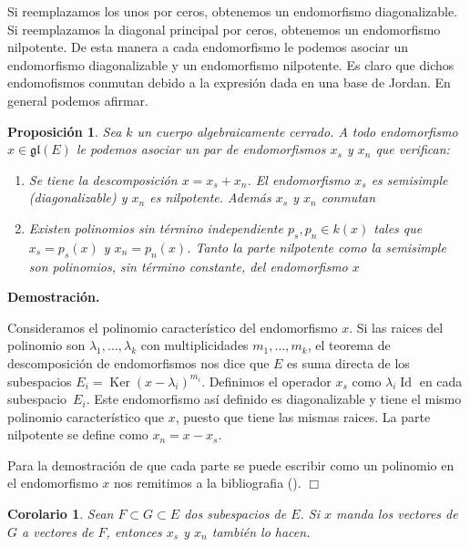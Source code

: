 \documentclass[a4paper,draft,12pt]{article}
\newtheorem{propo}[teo]{Proposición}%
\newtheorem{cor}[teo]{Corolario}%
\newcommand{\dem}{\noindent \textbf{Demostración. }\vspace{0.3 cm}}%
\newcommand{\fin}{ $\Box $ \vspace{0.4 cm}}
\DeclareMathOperator{\Ker}{Ker}%
\DeclareMathOperator{\Id}{Id}%
\begin{document}
Si reemplazamos los  unos por ceros, obtenemos un endomorfismo diagonalizable.  Si reemplazamos la diagonal principal por ceros, obtenemos un endomorfismo nilpotente. De esta manera a cada endomorfismo le podemos asociar un endomorfismo diagonalizable y un endomorfismo nilpotente.  Es claro que dichos endomofismos conmutan debido a la expresión dada en una base de Jordan. En general podemos afirmar.

\begin{propo}
Sea $k$ un cuerpo algebraicamente cerrado.
 A todo endomorfismo $x \in \mathfrak{gl}(E)$ le podemos asociar un par de endomorfismos $x_s$ y $x_n$ que verifican:
 
 \begin{enumerate}[\indent 1.- ]
 
 \item Se tiene la descomposición $x= x_s+x_n$. El endomorfismo $x_s$ es semisimple (diagonalizable) y $x_n$ es nilpotente. Además $x_s$ y $x_n$ conmutan
 
 \item Existen polinomios  sin término independiente $p_s, p_n \in k(x)$ tales que $x_s = p_s(x)$ y $x_n= p_n(x)$.  Tanto la parte nilpotente como la semisimple son polinomios, sin término constante, del endomorfismo $x$
 
 \end{enumerate}
 
 \end{propo}


\dem

Consideramos el polinomio característico del endomorfismo $x$.  Si las raices del polinomio son $\lambda_1, \dots, \lambda_k$ con multiplicidades $m_1,\dots,m_k$, el teorema de descomposición de endomorfismos nos dice que $E$ es suma directa de los sub\-espacios $E_i = \Ker(x-\lambda_i)^{m_i}$.  Definimos el operador $x_s$ como $\lambda_i\Id$ en cada subespacio~$E_i$.  Este endomorfismo así definido es diagonalizable y tiene el mismo polinomio característico que $x$, puesto que tiene las mismas raices.  La parte nilpotente se define como $x_n= x-x_s$.

\bigskip

Para la demostración de que cada parte se puede escribir como un polinomio en el endomorfismo $x$ nos remitimos a la bibliografia (\cite{humint}).  \fin


\begin{cor}

Sean $F \subset G \subset E$ dos subespacios de $E$.  Si $x$ manda los vectores de $G$ a vectores de $F$, entonces $x_s$ y $x_n$ también lo hacen.

\end{cor}
\end{document}
